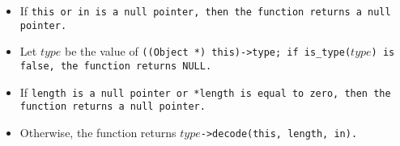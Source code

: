 \begin{itemize}

\item If \tt{this} or \tt{in} is a null pointer,
then the function returns a null pointer.

\item Let $type$ be the value of \tt{((Object *) this)->type};
if \tt{is_type(}$type$\tt{)} is \tt{false}, the function returns \tt{NULL}.

\item If \tt{length} is a null pointer or \tt{*length} is
equal to zero, then the function returns a null pointer.

\item Otherwise, the function returns $type$\tt{->decode(this, length, in)}.

\end{itemize}
